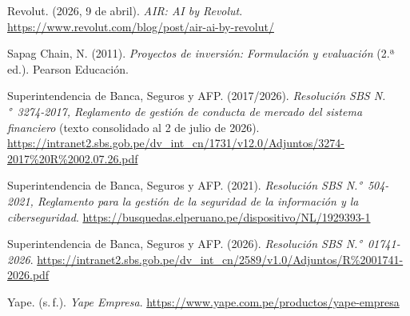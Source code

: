 \documentclass[11pt,a4paper]{article}
\begin{document}
{\begin{list}{}{\setlength{\leftmargin}{1.2em}\setlength{\itemindent}{-1.2em}\setlength{\itemsep}{0.55em}}
\item Revolut. (2026, 9 de abril). \textit{AIR: AI by Revolut}. \url{https://www.revolut.com/blog/post/air-ai-by-revolut/}

\item Sapag Chain, N. (2011). \textit{Proyectos de inversión: Formulación y evaluación} (2.ª ed.). Pearson Educación.

\item Superintendencia de Banca, Seguros y AFP. (2017/2026). \textit{Resolución SBS N.°~3274-2017, Reglamento de gestión de conducta de mercado del sistema financiero} (texto consolidado al 2 de julio de 2026). \url{https://intranet2.sbs.gob.pe/dv_int_cn/1731/v12.0/Adjuntos/3274-2017%20R%2002.07.26.pdf}

\item Superintendencia de Banca, Seguros y AFP. (2021). \textit{Resolución SBS N.°~504-2021, Reglamento para la gestión de la seguridad de la información y la ciberseguridad}. \url{https://busquedas.elperuano.pe/dispositivo/NL/1929393-1}

\item Superintendencia de Banca, Seguros y AFP. (2026). \textit{Resolución SBS N.°~01741-2026}. \url{https://intranet2.sbs.gob.pe/dv_int_cn/2589/v1.0/Adjuntos/R%2001741-2026.pdf}


\item Yape. (s.\,f.). \textit{Yape Empresa}. \url{https://www.yape.com.pe/productos/yape-empresa}
\end{list}
}
\end{document}

